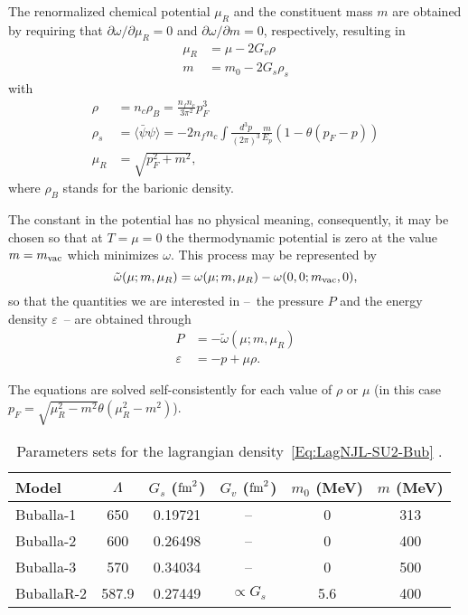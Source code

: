 \documentclass[prc, reprint, amsmath, floatfix, linenumbers,10pt]{revtex4-1}
\begin{document}
The renormalized chemical potential $\mu_R$ and the constituent mass $m$ are obtained by requiring that $\partial \omega / \partial \mu_R = 0$ and $\partial \omega / \partial m = 0$, respectively, resulting in
\begin{align}
	\mu_R &= \mu - 2 G_v \rho \\
	m &= m_0 - 2 G_s \rho_s
\end{align}
%
with
\begin{align}
	\rho &= n_c \rho_B = \frac{n_f n_c}{3\pi^2} p_F^3 \\
	\rho_s &= \langle \bar\psi\psi\rangle = - 2 n_f n_c \int\frac{d^3p}{(2\pi)^3} \frac{m}{E_p}(1 - \theta(p_F - p)) \\
	\mu_R &= \sqrt{p_F^2 + m^2},
\end{align}
%
where $\rho_B$ stands for the barionic density.

The constant in the potential has no physical meaning, consequently, it may be chosen so that at $T = \mu = 0$ the thermodynamic potential is zero at the value $m = m_{\rm{vac}}$ which minimizes $\omega$. This process may be represented by 
\begin{equation}
	\tilde\omega(\mu; m, \mu_R) = \omega(\mu; m, \mu_R) - \omega(0, 0; m_{\rm{vac}}, 0),
\end{equation}
%
so that the quantities we are interested in --~the pressure $P$ and the energy density $\varepsilon$~-- are obtained through
\begin{align}
		P &= -\tilde\omega(\mu; m, \mu_R) \label{Exp_pressao_T}\\
		\varepsilon &= -p + \mu \rho. \label{Exp_energia_T}
\end{align}
	
The equations are solved self-consistently for each value of $\rho$ or $\mu$ (in this case $p_F = \sqrt{\mu_R^2 - m^2}\theta(\mu_R^2 - m^2)$).

\begin{table}[!htpb]
\centering
\caption{Parameters sets for the lagrangian density~\eqref{Eq:LagNJL-SU2-Bub} \cite{Buballa1996, Buballa2005}. \label{Tab:Parametros_NJL}}
\begin{ruledtabular}
\begin{tabular}{lccccc}
Model &  $\Lambda$ & $G_s$ ($\rm{fm}^2$) & $G_v$ ($\rm{fm}^2$) & $m_0$ (MeV) & $m$ (MeV) \\
\hline
Buballa-1 & 650 & 0.19721 & -- & 0 & 313 \\
Buballa-2 & 600 & 0.26498 & -- & 0 & 400 \\
Buballa-3 & 570 & 0.34034 & -- & 0 & 500 \\
BuballaR-2 & 587.9 & 0.27449 & $\propto G_s$ & 5.6 & 400 \\
\end{tabular}
\end{ruledtabular}
\end{table}
\end{document}
